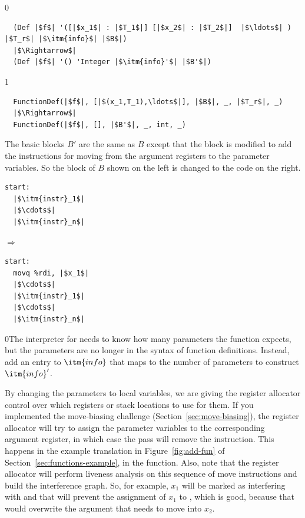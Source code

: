 \documentclass[7x10,nocrop]{TimesAPriori_MIT}%
\def\racketEd{0}
\def\pythonEd{1}
\def\edition{1}
\newcommand{\racket}[1]{{\if\edition\racketEd{#1}\fi}}
\begin{document}
{\if\edition\racketEd
\begin{lstlisting}
  (Def |$f$| '([|$x_1$| : |$T_1$|] [|$x_2$| : |$T_2$|]  |$\ldots$| ) |$T_r$| |$\itm{info}$| |$B$|)
  |$\Rightarrow$|
  (Def |$f$| '() 'Integer |$\itm{info}'$| |$B'$|)
\end{lstlisting}
\fi}
{\if\edition\pythonEd
\begin{lstlisting}
  FunctionDef(|$f$|, [|$(x_1,T_1),\ldots$|], |$B$|, _, |$T_r$|, _)
  |$\Rightarrow$|
  FunctionDef(|$f$|, [], |$B'$|, _, int, _)
\end{lstlisting}
\fi}
The basic blocks $B'$ are the same as $B$ except that the
 block is modified to add the instructions for moving from
the argument registers to the parameter variables. So the 
block of $B$ shown on the left is changed to the code on the right.
\begin{center}
\begin{minipage}{0.3\textwidth}
\begin{lstlisting}
start:
  |$\itm{instr}_1$|
  |$\cdots$|
  |$\itm{instr}_n$|
\end{lstlisting}
\end{minipage}
$\Rightarrow$
\begin{minipage}{0.3\textwidth}
\begin{lstlisting}
start:
  movq %rdi, |$x_1$|
  |$\cdots$|
  |$\itm{instr}_1$|
  |$\cdots$|
  |$\itm{instr}_n$|
\end{lstlisting}
\end{minipage}
\end{center}

\racket{The interpreter for \LangXIndCall{} needs to know how many
  parameters the function expects, but the parameters are no longer in
  the syntax of function definitions. Instead, add an entry to
  $\itm{info}$ that maps \code{num-params} to the number of parameters
  to construct $\itm{info}'$.}

By changing the parameters to local variables, we are giving the
register allocator control over which registers or stack locations to
use for them. If you implemented the move-biasing challenge
(Section~\ref{sec:move-biasing}), the register allocator will try to
assign the parameter variables to the corresponding argument register,
in which case the  pass will remove the
 instruction. This happens in the example translation in
Figure~\ref{fig:add-fun} of Section~\ref{sec:functions-example}, in
the  function.
%
Also, note that the register allocator will perform liveness analysis
on this sequence of move instructions and build the interference
graph. So, for example, $x_1$ will be marked as interfering with
 and that will prevent the assignment of $x_1$ to
, which is good, because that would overwrite the argument
that needs to move into $x_2$.
\end{document}
